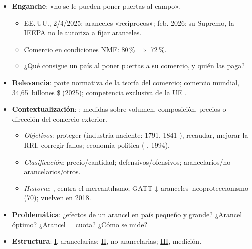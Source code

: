 \documentclass{article}
\begin{document}
\cabecerarepaso
\begin{columnas}

\begin{itemize}
\item \textbf{Enganche}: «no se le pueden poner puertas al campo».
  \begin{itemize}
  \item EE.\,UU., 2/4/2025: aranceles «recíprocos»; feb. 2026: su Supremo, la IEEPA no le autoriza a fijar aranceles.
  \item Comercio en condiciones NMF: 80\,\% $\Rightarrow$ 72\,\%.
  \item ¿Qué consigue un país al poner puertas a su comercio, y quién las paga?
  \end{itemize}
\item \textbf{Relevancia}: parte normativa de la teoría del comercio; comercio mundial, 34,65~billones \$ (2025); competencia exclusiva de la UE .
\item \textbf{Contextualización}: : medidas sobre volumen, composición, precios o dirección del comercio exterior.
  \begin{itemize}
  \item \emph{Objetivos}: proteger (industria naciente:  1791,  1841 ), recaudar, mejorar la RRI, corregir fallos; economía política (-, 1994).
  \item \emph{Clasificación}: precio/cantidad; defensivos/ofensivos; arancelarios/no arancelarios/otros.
  \item \emph{Historia}: ,  contra el mercantilismo; GATT ↓ aranceles; neoproteccionismo (70); vuelven en 2018.
  \end{itemize}
\item \textbf{Problemática}: ¿efectos de un arancel en país pequeño y grande? ¿Arancel óptimo? ¿Arancel = cuota? ¿Cómo se mide?
\item \textbf{Estructura}: \hyperref[rep:I]{I}, arancelarias; \hyperref[rep:II]{II}, no arancelarias; \hyperref[rep:III]{III}, medición.
\end{itemize}


\end{columnas}
\end{document}
